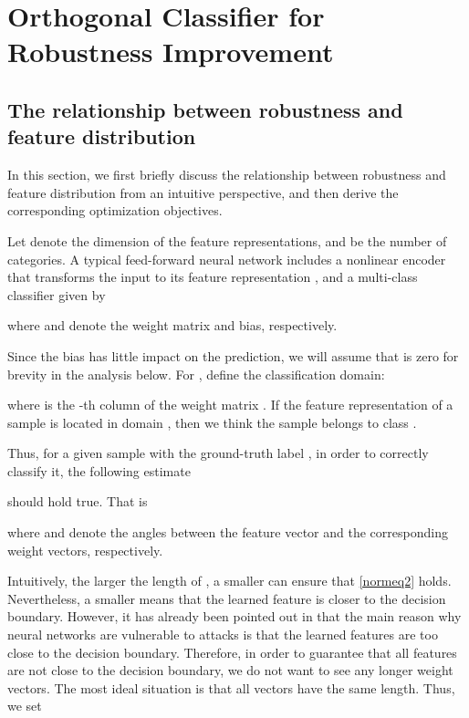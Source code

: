 \documentclass[preprint,review,12pt]{elsarticle}
\numberwithin{equation}{section}
\begin{document}
	
	
	
	
	
	\section{Orthogonal Classifier for Robustness Improvement }

	
	\subsection{The relationship between robustness and feature distribution}
	\label{sec:objectives}
	In this section, we first briefly discuss the relationship between robustness and feature distribution from an intuitive perspective,
	and then derive the corresponding optimization objectives.
	
	Let  denote the dimension of the feature representations, and  be the number of categories.
	A typical feed-forward neural network includes a nonlinear encoder  that
	transforms the input  to its feature representation ,
	and a multi-class classifier   given by
	
	where  and  denote the weight matrix and bias, respectively.


    Since the bias has little impact on the prediction,
    we will assume that  is zero for brevity  in the analysis below.
	For , define the classification domain:
	
	where  is the -th column of the weight matrix .
	If the feature representation of a sample is located in domain ,
    then we think the sample belongs to class .
	
	
	Thus, for a given sample  with the ground-truth label ,
    in order to correctly classify it,  the following estimate
	
	should hold true. That is
	
	where   and   denote the angles between the feature vector  and the corresponding weight vectors, respectively.

	Intuitively,
    the larger the length of   ,
    a smaller   can ensure that \eqref{normeq2} holds.
	Nevertheless, a smaller   means that the learned feature    is closer to the decision boundary.
	However,  it has already been pointed out  in \cite{moosavi2016} that the main reason why neural networks are vulnerable to attacks
    is that the learned features are too close to the decision boundary.
    Therefore,  in order to guarantee that all features are not close to the decision boundary,
    we do not want to see any longer weight vectors.
    The most ideal situation is that all vectors have the same length.
    Thus, we set
     
\end{document}
